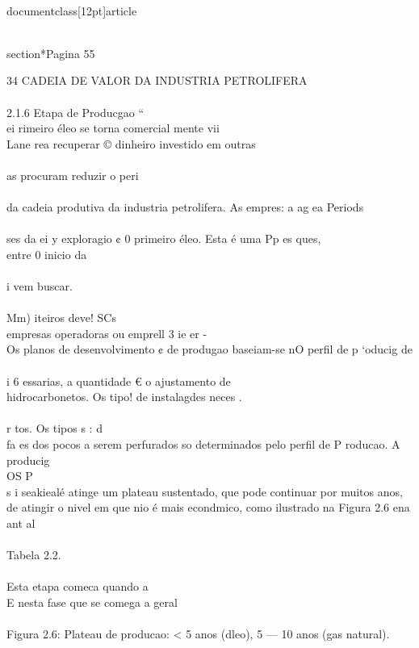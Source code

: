 \\documentclass[12pt]{article}
\begin{document}
\\section*{Pagina 55}

34 CADEIA DE VALOR DA INDUSTRIA PETROLIFERA\\
\\
2.1.6 Etapa de Producgao “\\
ei rimeiro éleo se torna comercial mente vii\\
Lane rea recuperar © dinheiro investido em outras\\
\\
as procuram reduzir o peri\\
\\
da cadeia produtiva da industria petrolifera. As empres: a ag ea Periods\\
\\
ses da ei y exploragio ¢ 0 primeiro éleo. Esta é uma Pp es ques,\\
entre 0 inicio da\\
\\
i vem buscar.\\
\\
Mm) iteiros deve! SCs\\
empresas operadoras ou emprell 3 ie er -\\
Os planos de desenvolvimento ¢ de produgao baseiam-se nO perfil de p ‘oducig de\\
\\
i 6 essarias, a quantidade € o ajustamento de\\
hidrocarbonetos. Os tipo! de instalagdes neces .\\
\\
r tos. Os tipos s : d\\
fa es dos pocos a serem perfurados so determinados pelo perfil de P roducao. A producig\\
OS P\\
s i seakiealé atinge um plateau sustentado, que pode continuar por muitos anos,\\
de atingir o nivel em que nio é mais econdmico, como ilustrado na Figura 2.6 ena\\
ant al\\
\\
Tabela 2.2.\\
\\
Esta etapa comeca quando a\\
E nesta fase que se comega a geral\\
\\
Figura 2.6: Plateau de producao: < 5 anos (dleo), 5 — 10 anos (gas natural).\\
\end{document}
